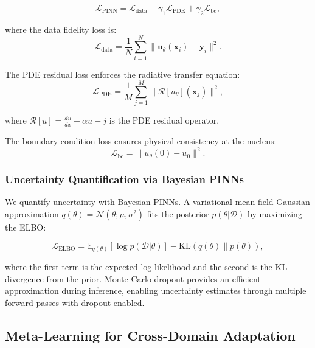 \documentclass[preprint2]{aastex631}
\begin{document}
\begin{equation}\label{eq:pinn_loss}
\mathcal{L}_{\text{PINN}} = \mathcal{L}_{\text{data}} + \gamma_1 \mathcal{L}_{\text{PDE}} + \gamma_2 \mathcal{L}_{\text{bc}},
\end{equation}

where the data fidelity loss is:
\begin{equation}\label{eq:data_loss}
\mathcal{L}_{\text{data}} = \frac{1}{N} \sum_{i=1}^{N} \|\mathbf{u}_\theta(\mathbf{x}_i) - \mathbf{y}_i\|^2.
\end{equation}

The PDE residual loss enforces the radiative transfer equation:
\begin{equation}\label{eq:pde_loss}
\mathcal{L}_{\text{PDE}} = \frac{1}{M} \sum_{j=1}^{M} \|\mathcal{R}[u_\theta](\mathbf{x}_j)\|^2,
\end{equation}

where $\mathcal{R}[u] = \frac{du}{dx} + \alpha u - j$ is the PDE residual operator.

The boundary condition loss ensures physical consistency at the nucleus:
\begin{equation}\label{eq:bc_loss}
\mathcal{L}_{\text{bc}} = \|u_\theta(0) - u_0\|^2.
\end{equation}

\subsubsection{Uncertainty Quantification via Bayesian PINNs}

We quantify uncertainty with Bayesian PINNs. A variational mean-field Gaussian approximation $q(\theta) = \mathcal{N}(\theta; \mu, \sigma^2)$ fits the posterior $p(\theta | \mathcal{D})$ by maximizing the ELBO:

\begin{equation}\label{eq:elbo}
\mathcal{L}_{\text{ELBO}} = \mathbb{E}_{q(\theta)}[\log p(\mathcal{D}|\theta)] - \text{KL}(q(\theta) \| p(\theta)),
\end{equation}

where the first term is the expected log-likelihood and the second is the KL divergence from the prior. Monte Carlo dropout \citep{gal16} provides an efficient approximation during inference, enabling uncertainty estimates through multiple forward passes with dropout enabled.

\subsection{Meta-Learning for Cross-Domain Adaptation}
\end{document}
